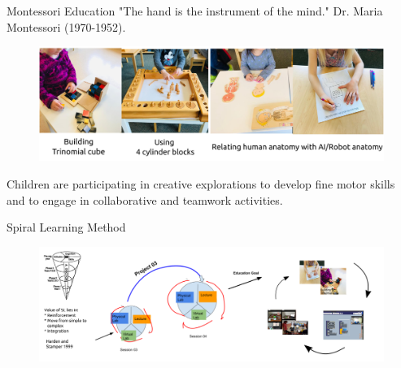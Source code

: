 {
\begin{frame}{Montessori Education} 
\vspace{3mm}
"The hand is the instrument of the mind."
Dr. Maria Montessori (1970-1952).

\vspace{2mm}
    \begin{figure}
        \centering
        \includegraphics[width=1.0\textwidth]{./figures/montessori/outputs/drawing-v00.png}
      \end{figure}

Children are participating in creative explorations to develop fine motor skills and to engage in collaborative and teamwork activities. 

\end{frame}
}



{
\begin{frame}{Spiral Learning Method}

  \begin{figure}
        \centering
        \includegraphics[width=1.0\textwidth]{./figures/teaching-materials/outputs/drawing-v02.png}
      \end{figure}
\end{frame}
}
